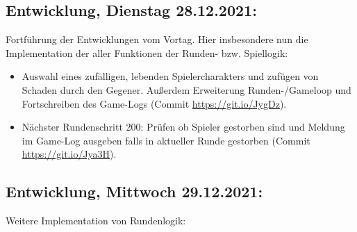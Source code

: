 \subsection{Entwicklung, Dienstag 28.12.2021:}

Fortführung der Entwicklungen vom Vortag. Hier insbesondere nun die Implementation der aller Funktionen der Runden- bzw. Spiellogik:

\begin{itemize}
    \item Auswahl eines zufälligen, lebenden Spielercharakters und zufügen von Schaden durch den Gegener. Außerdem Erweiterung Runden-/Gameloop und Fortschreiben des Game-Logs (Commit \url{https://git.io/JygDz}).
    \item Nächster Rundenschritt 200: Prüfen ob Spieler gestorben sind und Meldung im Game-Log ausgeben falls in aktueller Runde gestorben (Commit \url{https://git.io/Jya3H}). 
\end{itemize}


\subsection{Entwicklung, Mittwoch 29.12.2021:}

Weitere Implementation von Rundenlogik:

